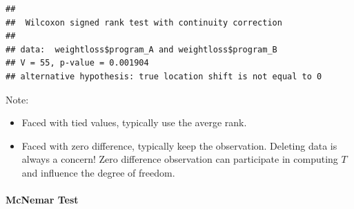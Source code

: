 \documentclass[
]{ctexart}
\newenvironment{Shaded}{\begin{snugshade}}{\end{snugshade}}
\newcommand{\AttributeTok}[1]{\textcolor[rgb]{0.13,0.29,0.53}{#1}}
\newcommand{\CommentTok}[1]{\textcolor[rgb]{0.56,0.35,0.01}{\textit{#1}}}
\newcommand{\ConstantTok}[1]{\textcolor[rgb]{0.56,0.35,0.01}{#1}}
\newcommand{\DecValTok}[1]{\textcolor[rgb]{0.00,0.00,0.81}{#1}}
\newcommand{\FunctionTok}[1]{\textcolor[rgb]{0.13,0.29,0.53}{\textbf{#1}}}
\newcommand{\NormalTok}[1]{#1}
\newcommand{\OtherTok}[1]{\textcolor[rgb]{0.56,0.35,0.01}{#1}}
\newcommand{\SpecialCharTok}[1]{\textcolor[rgb]{0.81,0.36,0.00}{\textbf{#1}}}
\providecommand{\tightlist}{%
  \setlength{\itemsep}{0pt}\setlength{\parskip}{0pt}}
\begin{document}
\begin{Shaded}
\end{Shaded}

\begin{verbatim}
## 
##  Wilcoxon signed rank test with continuity correction
## 
## data:  weightloss$program_A and weightloss$program_B
## V = 55, p-value = 0.001904
## alternative hypothesis: true location shift is not equal to 0
\end{verbatim}

Note:

\begin{itemize}
\tightlist
\item
  Faced with tied values, typically use the averge rank.
\item
  Faced with zero difference, typically keep the observation. Deleting
  data is always a concern! Zero difference observation can participate
  in computing \(T\) and influence the degree of freedom.
\end{itemize}

\hypertarget{mcnemar-test}{%
\paragraph{McNemar Test}\label{mcnemar-test}}
\end{document}
